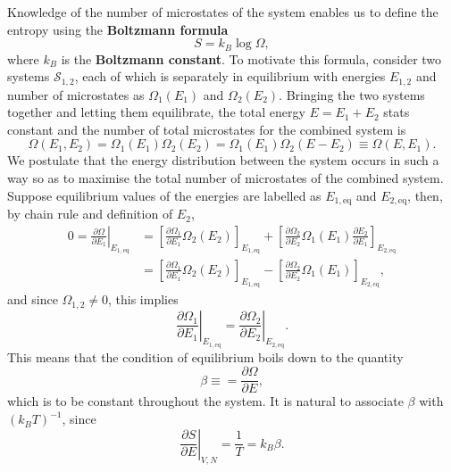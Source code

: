 \documentclass[letter-paper]{tufte-book}
\newcommand\Def[1]{\textbf{#1}}
\begin{document}
Knowledge of the number of microstates of the system enables us to define the
entropy using the \Def{Boltzmann formula}
\begin{equation}
  S = k_B \log \Omega,
\end{equation}
where $k_B$ is the \Def{Boltzmann constant}.
To motivate this formula, consider two systems $\mathcal{S}_{1,2}$, each of
which is separately in equilibrium with energies $E_{1,2}$ and number of
microstates as $\Omega_1(E_1)$ and $\Omega_2(E_2)$. Bringing the two systems
together and letting them equilibrate, the total energy $E = E_1 + E_2$ stats
constant and the number of total microstates for the combined system is
\begin{equation*}
  \Omega(E_1, E_2) = \Omega_1 (E_1) \Omega_2 (E_2) = \Omega_1 (E_1) \Omega_2 (E - E_2) \equiv \Omega(E, E_1).
\end{equation*}
We postulate that the energy distribution between the system occurs in such a
way so as to maximise the total number of microstates of the combined system.
Suppose equilibrium values of the energies are labelled as $E_{1, \mathrm{eq}}$
and $E_{2, \mathrm{eq}}$, then, by chain rule and definition of $E_2$,
\begin{align*}
  0 = \left.\frac{\partial \Omega}{\partial E_1}\right|_{E_{1, \mathrm{eq}}} &= \left[\frac{\partial \Omega_1}{\partial E_1} \Omega_2 (E_2)\right]_{E_{1, \mathrm{eq}}} + \left[\frac{\partial \Omega_2}{\partial E_2} \Omega_1 (E_1) \frac{\partial E_2}{\partial E_1}\right]_{E_{2, \mathrm{eq}}} \\
    & = \left[\frac{\partial \Omega_1}{\partial E_1} \Omega_2 (E_2)\right]_{E_{1, \mathrm{eq}}} - \left[\frac{\partial \Omega_2}{\partial E_2} \Omega_1 (E_1)\right]_{E_{2, \mathrm{eq}}},
\end{align*}
and since $\Omega_{1,2} \neq 0$, this implies
\begin{equation*}
  \left.\frac{\partial \Omega_1}{\partial E_1}\right|_{E_{1, \mathrm{eq}}} = \left.\frac{\partial \Omega_2}{\partial E_2}\right|_{E_{2, \mathrm{eq}}}.
\end{equation*}
This means that the condition of equilibrium boils down to the quantity
\begin{equation}
  \beta \equiv = \frac{\partial \Omega}{\partial E},
\end{equation}
which is to be constant throughout the system. It is natural to associate
$\beta$ with $(k_B T)^{-1}$, since
\begin{equation*}
  \left.\frac{\partial S}{\partial E}\right|_{V,N} = \frac{1}{T} = k_B \beta.
\end{equation*}
\end{document}
